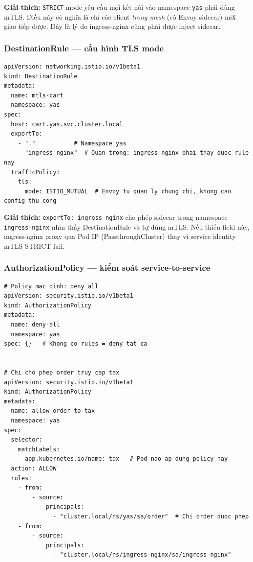 \textbf{Giải thích:} \texttt{STRICT} mode yêu cầu mọi kết nối vào namespace \texttt{yas}
phải dùng mTLS. Điều này có nghĩa là chỉ các client \textit{trong mesh} (có Envoy sidecar)
mới giao tiếp được. Đây là lý do ingress-nginx cũng phải được inject sidecar.

\subsubsection{DestinationRule — cấu hình TLS mode}

\begin{lstlisting}[style=yamlstyle, caption=istio/destination-rule.yaml (trích — 1 trong 21 rules)]
apiVersion: networking.istio.io/v1beta1
kind: DestinationRule
metadata:
  name: mtls-cart
  namespace: yas
spec:
  host: cart.yas.svc.cluster.local
  exportTo:
    - "."           # Namespace yas
    - "ingress-nginx"  # Quan trong: ingress-nginx phai thay duoc rule nay
  trafficPolicy:
    tls:
      mode: ISTIO_MUTUAL  # Envoy tu quan ly chung chi, khong can config thu cong
\end{lstlisting}

\textbf{Giải thích:} \texttt{exportTo: ingress-nginx} cho phép sidecar trong namespace
\texttt{ingress-nginx} nhìn thấy DestinationRule và tự dùng mTLS. Nếu thiếu field này,
ingress-nginx proxy qua Pod IP (PassthroughCluster) thay vì service identity \textrightarrow{} mTLS STRICT fail.

\subsubsection{AuthorizationPolicy — kiểm soát service-to-service}

\begin{lstlisting}[style=yamlstyle, caption=istio/authorization-policy.yaml (trích)]
# Policy mac dinh: deny all
apiVersion: security.istio.io/v1beta1
kind: AuthorizationPolicy
metadata:
  name: deny-all
  namespace: yas
spec: {}   # Khong co rules = deny tat ca

---
# Chi cho phep order truy cap tax
apiVersion: security.istio.io/v1beta1
kind: AuthorizationPolicy
metadata:
  name: allow-order-to-tax
  namespace: yas
spec:
  selector:
    matchLabels:
      app.kubernetes.io/name: tax   # Pod nao ap dung policy nay
  action: ALLOW
  rules:
    - from:
        - source:
            principals:
              - "cluster.local/ns/yas/sa/order"  # Chi order duoc phep
    - from:
        - source:
            principals:
              - "cluster.local/ns/ingress-nginx/sa/ingress-nginx"
\end{lstlisting}

